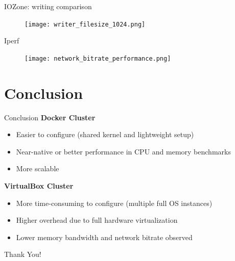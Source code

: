 \documentclass[10pt]{beamer}
\begin{document}
\begin{frame}{IOZone: writing comparison}
  \begin{figure}
    \centering
    \texttt{[image: writer\_filesize\_1024.png]}
  \end{figure}
\end{frame}

\begin{frame}[fragile]{Iperf}
\begin{figure}
  \centering
  \texttt{[image: network\_bitrate\_performance.png]}
\end{figure}
\end{frame}

\section{Conclusion}

\begin{frame}{Conclusion}
  \textbf{Docker Cluster}
  \begin{itemize}
    \item Easier to configure (shared kernel and lightweight setup)
    \item Near-native or better performance in CPU and memory benchmarks
    \item More scalable
  \end{itemize}
  \textbf{VirtualBox Cluster}
  \begin{itemize}
    \item More time-consuming to configure (multiple full OS instances)
    \item Higher overhead due to full hardware virtualization
    \item Lower memory bandwidth and network bitrate observed
  \end{itemize}
\end{frame}

{
\begin{frame}[standout]
\thispagestyle{empty}
  {\LARGE Thank You!}
\end{frame}
}
\end{document}
